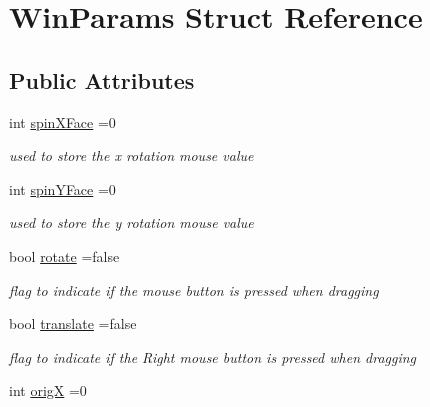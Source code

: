 \hypertarget{struct_win_params}{}\section{Win\+Params Struct Reference}
\label{struct_win_params}
\subsection*{Public Attributes}
\begin{DoxyCompactItemize}
\item 
int \hyperlink{struct_win_params_ae834d382a91e06699778caf8abf8b6a0}{spin\+X\+Face} =0\hypertarget{struct_win_params_ae834d382a91e06699778caf8abf8b6a0}{}\label{struct_win_params_ae834d382a91e06699778caf8abf8b6a0}

\begin{DoxyCompactList}\small\item\em used to store the x rotation mouse value \end{DoxyCompactList}\item 
int \hyperlink{struct_win_params_adf538a60ecec846bb85fb790cdf02ef6}{spin\+Y\+Face} =0\hypertarget{struct_win_params_adf538a60ecec846bb85fb790cdf02ef6}{}\label{struct_win_params_adf538a60ecec846bb85fb790cdf02ef6}

\begin{DoxyCompactList}\small\item\em used to store the y rotation mouse value \end{DoxyCompactList}\item 
bool \hyperlink{struct_win_params_a255e3c376110315e2a4ff63ccc312360}{rotate} =false\hypertarget{struct_win_params_a255e3c376110315e2a4ff63ccc312360}{}\label{struct_win_params_a255e3c376110315e2a4ff63ccc312360}

\begin{DoxyCompactList}\small\item\em flag to indicate if the mouse button is pressed when dragging \end{DoxyCompactList}\item 
bool \hyperlink{struct_win_params_adcfa86195240b478c94bfecc5e33e8e7}{translate} =false\hypertarget{struct_win_params_adcfa86195240b478c94bfecc5e33e8e7}{}\label{struct_win_params_adcfa86195240b478c94bfecc5e33e8e7}

\begin{DoxyCompactList}\small\item\em flag to indicate if the Right mouse button is pressed when dragging \end{DoxyCompactList}\item 
int \hyperlink{struct_win_params_ab9ddf234ba11eb4460eb48469cd73c3a}{origX} =0\hypertarget{struct_win_params_ab9ddf234ba11eb4460eb48469cd73c3a}{}\label{struct_win_params_ab9ddf234ba11eb4460eb48469cd73c3a}


\end{DoxyCompactItemize}
